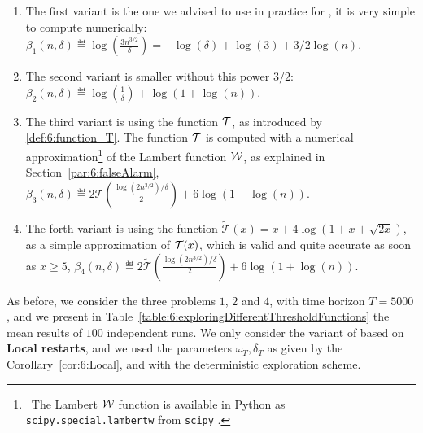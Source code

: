 \begin{enumerate}[label=$\beta_{\arabic*}$]
    \item
    The first variant is the one we advised to use in practice for \GLRklUCB,
    it is very simple to compute numerically: $\beta_1(n, \delta) \eqdef \log\left(\frac{3 n^{3/2}}{\delta}\right) = -\log(\delta) + \log(3) + 3/2 \log(n)$.

    \item
    The second variant is smaller without this power $3/2$: $\beta_2(n, \delta) \eqdef \log\left(\frac{1}{\delta}\right) + \log(1 + \log(n))$.

    \item
    The third variant is using the function $\mathcal{T}$, as introduced by \eqref{def:6:function_T}.
    The function $\mathcal{T}$ is computed with a numerical approximation\footnote{~The Lambert $\mathcal{W}$ function is available in Python as \texttt{scipy.special.lambertw} from \texttt{scipy} \cite{scipy}.} of the Lambert function $\mathcal{W}$, as explained in Section~\ref{par:6:falseAlarm}, $\beta_3(n, \delta) \eqdef 2 \mathcal{T}\left(\frac{\log(2 n^{3/2}) / \delta}{2}\right) + 6 \log(1 + \log(n))$.

    \item
    The forth variant is using the function $\widetilde{\mathcal{T}}(x) = x + 4 \log(1 + x + \sqrt{2x})$, as a simple approximation of $\mathcal{T}(x)$, which is valid and quite accurate as soon as $x \geq 5$, $\beta_4(n, \delta) \eqdef 2 \widetilde{\mathcal{T}}\left(\frac{\log(2 n^{3/2}) / \delta}{2}\right) + 6 \log(1 + \log(n))$.
\end{enumerate}

As before, we consider the three problems $1$, $2$ and $4$, with time horizon $T=5000$,
and we present in Table~\ref{table:6:exploringDifferentThresholdFunctions} the mean results of $100$ independent runs.
We only consider the variant of \GLRklUCB{} based on \textbf{Local restarts}, and we used the parameters $\omega_T,\delta_T$ as given by the Corollary~\ref{cor:6:Local},
and with the deterministic exploration scheme.

